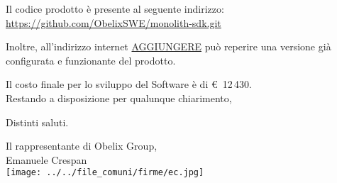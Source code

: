 \documentclass[10 pt,a4paper]{article}
\begin{document}
Il codice prodotto è presente al seguente indirizzo: \\
\url{https://github.com/ObelixSWE/monolith-sdk.git}

\clearpage

Inoltre, all'indirizzo internet \url{AGGIUNGERE} può reperire una versione già configurata e funzionante del prodotto. \\


\vspace{.1in}


Il costo finale per lo sviluppo del Software è di \euro  \, 12\,430. \\

\vspace{.1in}
Restando a disposizione per qualunque chiarimento,\\

\vspace{.1in}

Distinti saluti.

\vspace{.15in}


\begin{flushright}
Il rappresentante di Obelix Group,\\
Emanuele Crespan\\
\texttt{[image: ../../file\_comuni/firme/ec.jpg]}
\end{flushright}
\end{document}
